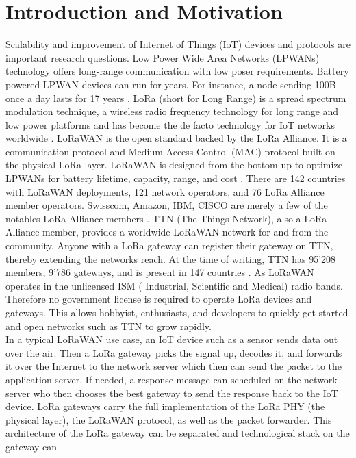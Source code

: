 \chapter{Introduction and Motivation}
\label{thesis:introduction}
Scalability and improvement of Internet of Things (IoT) devices and protocols
are important research questions.
Low Power Wide Area Networks (LPWANs) technology offers long-range communication
with low poser requirements. Battery powered LPWAN devices can run for years.
For instance, a node sending 100B once a day lasts for 17 years \cite{morin}.
LoRa (short for Long Range) is a spread spectrum modulation
technique, a wireless radio frequency technology for long range and low power platforms
and has become the de facto technology for IoT networks worldwide \cite{what_is_lora}.
LoRaWAN is the open standard backed by the LoRa Alliance. It is a communication protocol and
Medium Access Control (MAC) protocol built on the physical LoRa layer.
LoRaWAN is designed from the bottom up to optimize LPWANs
for battery lifetime, capacity, range, and cost \cite{what_is_lora_wan}.
There are 142 countries with LoRaWAN deployments, 121 network operators,
and 76 LoRa Alliance member operators. Swisscom, Amazon, IBM, CISCO are merely a few of the 
notables LoRa Alliance members \cite{lora_alliance}.
TTN (The Things Network), also a LoRa Alliance member, provides a worldwide LoRaWAN network 
for and from the community. Anyone with a LoRa gateway can register their gateway on TTN, thereby
extending the networks reach. At the time of writing, TTN has 95'208 members, 9'786 gateways, and is
present in 147 countries \cite{ttn}. As LoRaWAN operates in the unlicensed ISM ( Industrial, Scientific and Medical)
radio bands. Therefore no government license is required to operate LoRa devices and gateways. 
This allows hobbyist, enthusiasts, and developers to quickly get started and open networks such as TTN
to grow rapidly.
\\
In a typical LoRaWAN use case, an IoT device such as a sensor sends data out over the air. Then a LoRa gateway picks
the signal up, decodes it, and forwards it over the Internet to the network server which then can send the packet to 
the application server. If needed, a response message can scheduled on the network server who then chooses the best gateway
to send the response back to the IoT device.
LoRa gateways carry the full implementation of the LoRa PHY (the physical layer), the LoRaWAN protocol, as well as 
the packet forwarder. This architecture of the LoRa gateway can be separated and technological stack on the gateway can 
